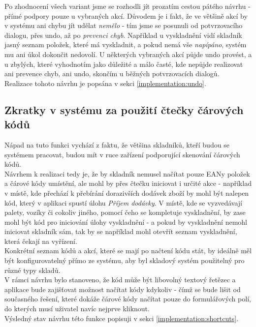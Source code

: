 Po zhodnocení všech variant jsme se rozhodli jít prozatím cestou pátého návrhu - přímé podpory pouze u vybraných akcí. Důvodem je i fakt, že ve většině akcí by v systému ani chybu jít udělat \emph{nemělo} - tím jsme se posunuli od potvrzovacího dialogu, přes undo, až po \emph{prevenci chyb}. Například u vyskladnění vidí skladník jasný seznam položek, které má vyskladnit, a pokud nemá vše \emph{napípáno}, systém mu ani úkol dokončit nedovolí. U některých vybraných akcí půjde undo provést, a u zbylých, které vyhodnotím jako důležité a málo časté, kde nepůjde realizovat ani prevence chyb, ani undo, skončím u běžných potvrzovacích dialogů.\\
Realizace tohoto návrhu je popsána v sekci \ref{implementation:undo}.


\subsection{Zkratky v systému za použití čtečky čárových kódů}\label{draft:shortcuts}

Nápad na tuto funkci vychází z faktu, že většina skladníků, kteří budou se systémem pracovat, budou mít v ruce zařízení podporující skenování čárových kódů.\\
Návrhem k realizaci tedy je, že by skladník nemusel načítat pouze EANy položek a čárové kódy umístění, ale mohl by přes čtečku iniciovat i určité akce - například v místě, kde přechází k přebírání dorazivších dodávek zboží by mohl být nalepen kód, který v aplikaci spustí úlohu \emph{Příjem dodávky}. V místě, kde se vyzvedávají palety, vozíky či cokoliv jiného, pomocí čeho se kompletuje vyskladnění, by zase mohl být kód pro iniciování úlohy vyskladnění - a pokud by vyskladnění nemohl iniciovat skladník sám, tak by se například mohl otevřít seznam vyskladnění, která čekají na vyřízení.\\
Konkrétní seznam kódů a akcí, které se mají po načtení kódu stát, by ideálně měl být konfigurovatelný přímo ze systému, aby byl skladový systém použitelný pro různé typy skladů.\\
V rámci návrhu bylo stanoveno, že kód může být libovolný textový řetězec a aplikace bude zajišťovat možnost načítat kódy kdykoliv - čímž se bude lišit od současného řešení, které dokáže čárové kódy načítat pouze do formulářových polí, do kterých musí uživatel navíc nejprve kliknout.\\
Výsledný stav návrhu této funkce popisuji v sekci \ref{implementation:shortcuts}.
